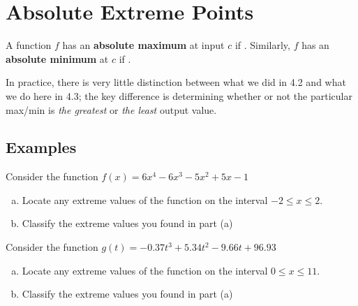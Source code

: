 \documentclass[notes]{subfiles}
\begin{document}
	\fancyhead[LO,RE]{\bfseries  \currentname}
	\fancyfoot[C]{{}}
	\fancyfoot[RO,LE]{\large \thepage}	%



\section*{Absolute Extreme Points}\label{cs43}

	\begin{defn} A function $f$ has an \textbf{absolute maximum} at input $c$ if .  Similarly, $f$ has an \textbf{absolute minimum} at $c$ if .
	\end{defn}
	In practice, there is very little distinction between what we did in 4.2 and what we do here in 4.3; the key difference is determining whether or not the particular max/min is \emph{the greatest} or \emph{the least} output value.
	\subsection*{Examples}
		\begin{ex}
			Consider the function $f(x) = 6x^4-6x^3-5x^2+5x-1$
			\begin{enumerate}[(a)]
				\item Locate any extreme values of the function on the interval $-2\leq x\leq 2$.
				\item Classify the extreme values you found in part (a)
			\end{enumerate}
		\end{ex}
			\newpage
			
		\begin{ex}
			Consider the function $g(t) = -0.37t^3 + 5.34t^2 -9.66t + 96.93$
			\begin{enumerate}[(a)]
				\item Locate any extreme values of the function on the interval $0\leq x\leq 11$.
					\vs{1}
				\item Classify the extreme values you found in part (a)
					\vs{2}
			\end{enumerate}
		\end{ex}
		
\end{document}
